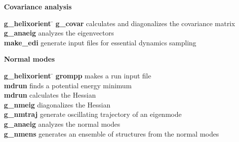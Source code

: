 \begin{description}
\item {\large\bf Covariance analysis}
\vspace{-2ex}\begin{tabbing}
{\bf g\_helixorient} \= \kill
{\bf g\_covar} \> calculates and diagonalizes the covariance matrix \\
{\bf g\_anaeig} \> analyzes the eigenvectors \\
{\bf make\_edi} \> generate input files for essential dynamics sampling \\
\end{tabbing}\vspace{-2ex}

\item {\large\bf Normal modes}
\vspace{-2ex}\begin{tabbing}
{\bf g\_helixorient} \= \kill
{\bf grompp} \> makes a run input file \\
{\bf mdrun} \> finds a potential energy minimum \\
{\bf mdrun} \> calculates the Hessian \\
{\bf g\_nmeig} \> diagonalizes the Hessian  \\
{\bf g\_nmtraj} \> generate oscillating trajectory of an eigenmode \\
{\bf g\_anaeig} \> analyzes the normal modes \\
{\bf g\_nmens} \> generates an ensemble of structures from the normal modes \\
\end{tabbing}\vspace{-2ex}

\end{description}

